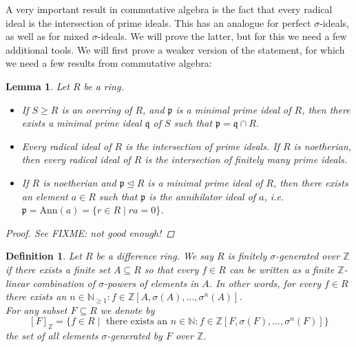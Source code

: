 \documentclass{article}
\def\NE{\mathbb{N}_{\geq1}}
\def\N{\mathbb{N}}
\def\Z{\mathbb{Z}}
\def\p{\mathfrak{p}}
\def\q{\mathfrak{q}}
\def\s{\sigma}
\newenvironment{bew}{\begin{proof}[Proof]}{\end{proof}}
\theoremstyle{plain}
\newtheorem{lem}[Satz]{Lemma}
\newtheorem{defn}[Satz]{Definition}
\theoremstyle{definition}
\begin{document}
A very important result in commutative algebra is the fact that every radical ideal is the intersection of prime ideals. This has an analogue for perfect $\s$-ideals, as well as for mixed $\s$-ideals. 
We will prove the latter, but for this we need a few additional tools. We will first prove a weaker version of the statement, for which we need a few results from commutative algebra:

\begin{lem}\label{commalg}
Let $R$ be a ring. 
\begin{itemize}
\item If $S \geq R$ is an overring of $R$, and $\p$ is a minimal prime ideal of $R$, then there exists a minimal prime ideal $\q$ of $S$ such that $\p = \q \cap R$.
\item Every radical ideal of $R$ is the intersection of prime ideals. If $R$ is noetherian, then every radical ideal of $R$ is the intersection of finitely many prime ideals.
\item If $R$ is noetherian and $\p \unlhd R$ is a minimal prime ideal of $R$, then there exists an element $a \in R$ such that $\p$ is the annihilator ideal of $a$, i.e. $\p = \text{Ann}(a) = \{ r \in R \mid ra = 0 \}$.
\end{itemize}
\begin{bew}
See \cite{wibmer} FIXME: not good enough!
\end{bew}
\end{lem}

\begin{defn}
Let $R$ be a difference ring. We say $R$ is \emph{finitely $\s$-generated over $\Z$} if there exists a finite set $A \subseteq R$ so that every $f \in R$ can be written as a finite $\Z$-linear combination of $\s$-powers of elements in $A$. In other words,
for every $f \in R$ there exists an $n \in \NE: f \in \Z[A,\sigma(A),\ldots,\s^n(A)]$. \\ 
\indent For any subset $F \subseteq R$ we denote by $$[F]_{\Z} = \{ f \in R \mid \text{ there exists an } n \in \N: f \in \Z[F, \s(F), \ldots, \s^n(F)] \}$$ the set of all elements $\s$-generated by $F$ over $\Z$.
\end{defn}\index{finitely $\s$-generated over $\Z$}
\end{document}
